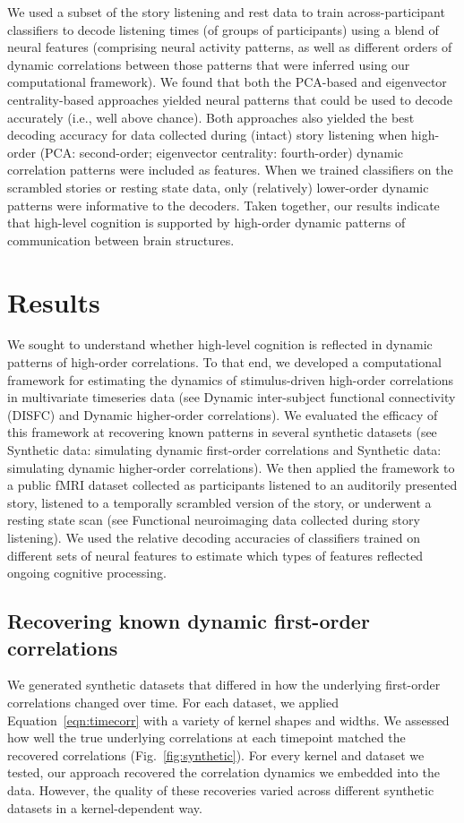 \documentclass[english]{article}
\begin{document}
We used a subset of the story listening and rest data to train
across-participant classifiers to decode listening times (of groups of
participants) using a blend of neural features (comprising neural
activity patterns, as well as different orders of dynamic correlations
between those patterns that were inferred using our computational
framework).  We found that both the PCA-based and eigenvector
centrality-based approaches yielded neural patterns that could be used
to decode accurately (i.e., well above chance).  Both approaches also
yielded the best decoding accuracy for data collected during (intact)
story listening when high-order (PCA: second-order; eigenvector
centrality: fourth-order) dynamic correlation patterns were included
as features.  When we trained classifiers on the scrambled stories or
resting state data, only (relatively) lower-order dynamic patterns
were informative to the decoders.  Taken together, our results
indicate that high-level cognition is supported by high-order dynamic
patterns of communication between brain structures.




\section*{Results}
We sought to understand whether high-level cognition is reflected in
dynamic patterns of high-order correlations.  To that end, we
developed a computational framework for estimating the dynamics of
stimulus-driven high-order correlations in multivariate timeseries
data (see Dynamic inter-subject functional connectivity
  (DISFC) and Dynamic higher-order correlations).  We
evaluated the efficacy of this framework at recovering known patterns
in several synthetic datasets (see Synthetic data: simulating
  dynamic first-order correlations and Synthetic data:
  simulating dynamic higher-order correlations).  We then
applied the framework to a public fMRI dataset collected as
participants listened to an auditorily presented story, listened to a
temporally scrambled version of the story, or underwent a resting
state scan (see Functional neuroimaging data collected during
  story listening).  We used the relative decoding accuracies of
classifiers trained on different sets of neural features to estimate
which types of features reflected ongoing cognitive processing.


\subsection*{Recovering known dynamic first-order correlations}
We generated synthetic datasets that differed in how the underlying first-order
correlations changed over time.  For each dataset, we applied
Equation~\ref{eqn:timecorr} with a variety of kernel shapes and
widths.  We assessed how well the true underlying correlations at each
timepoint matched the recovered correlations
(Fig.~\ref{fig:synthetic}).  For every kernel and dataset we tested,
our approach recovered the correlation dynamics we embedded into the
data.  However, the quality of these recoveries varied across
different synthetic datasets in a kernel-dependent way.
\end{document}
